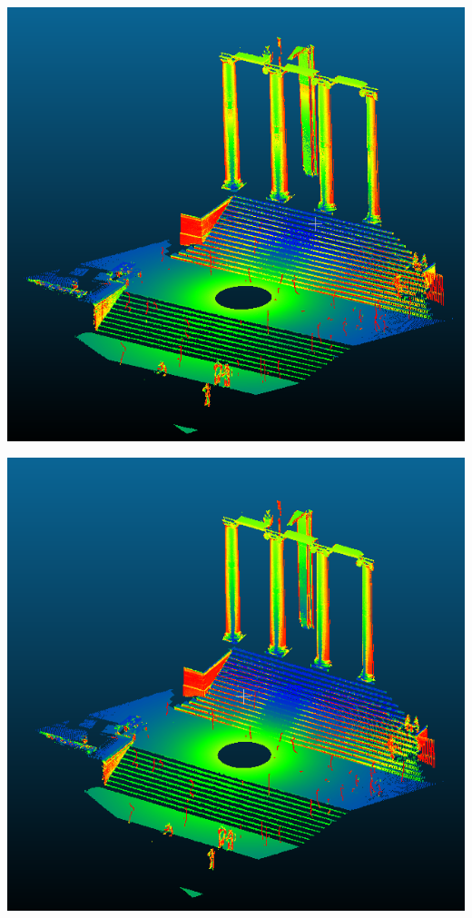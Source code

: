 \documentclass[11pt,a4paper]{article}
\begin{document}
\begin{minipage}{0.9\textwidth}
	\begin{minipage}{.5\textwidth}
		
		\includegraphics[width=0.8\linewidth]{./Anglek=40}
		\label{fig:Angleformvertk=40}
	\end{minipage}%
	\begin{minipage}{.5\textwidth}
		
		\includegraphics[width=0.8\linewidth]{./Anglek=60}
		\label{fig:Angleformvertk=60}
	\end{minipage}
	\end{minipage} %
\end{document}
